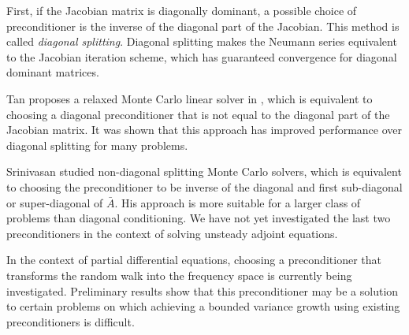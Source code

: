         First, if the Jacobian matrix is diagonally dominant, a possible
        choice of preconditioner is the inverse of the diagonal part of the
        Jacobian. This method is called \emph{diagonal splitting}.  Diagonal
        splitting makes the Neumann series equivalent to the Jacobian
        iteration scheme, which has guaranteed convergence for diagonal
        dominant matrices.
        
        Tan proposes a relaxed Monte Carlo linear solver in \cite[]{Tan2001}
        \cite[]{Tan2002}, which is equivalent to choosing a diagonal
        preconditioner that is not equal to the diagonal part of the Jacobian
        matrix.  It was shown that this approach has improved performance
        over diagonal splitting for many problems.
        
        Srinivasan \cite[]{Srinivasan2003} studied non-diagonal splitting
        Monte Carlo solvers, which is equivalent to choosing the preconditioner
        to be inverse of the diagonal and first sub-diagonal or super-diagonal
        of $\bar{A}$.
        His approach is more suitable for a larger class of problems
        than diagonal conditioning.  We have not yet investigated the last two
        preconditioners in the context of solving unsteady adjoint equations.

        In the context of partial differential equations, choosing a
        preconditioner that transforms the random walk into the frequency
        space is currently being investigated.  Preliminary results
        show that this preconditioner may be a solution to certain problems
        on which achieving a bounded variance growth using existing
        preconditioners is difficult.
    




